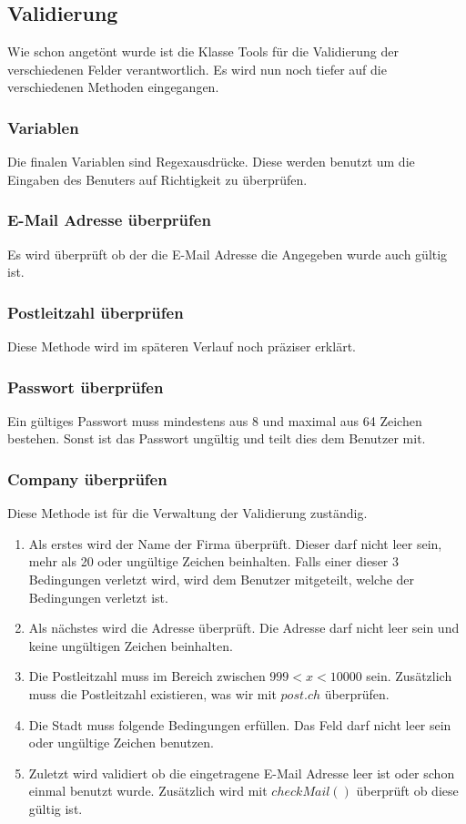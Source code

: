 \documentclass[10pt]{article}
\begin{document}
\subsection{Validierung}
Wie schon angetönt wurde ist die Klasse Tools für die Validierung der verschiedenen Felder verantwortlich. Es wird nun noch tiefer auf die verschiedenen Methoden eingegangen.
\subsubsection{Variablen}
Die finalen Variablen sind Regexausdrücke. Diese werden benutzt um die Eingaben des Benuters auf Richtigkeit zu überprüfen.

\subsubsection{E-Mail Adresse überprüfen}
Es wird überprüft ob der die E-Mail Adresse die Angegeben wurde auch gültig ist.

\subsubsection{Postleitzahl überprüfen}
Diese Methode wird im späteren Verlauf noch präziser erklärt.
\subsubsection{Passwort überprüfen}
Ein gültiges Passwort muss mindestens aus 8 und maximal aus 64 Zeichen bestehen. Sonst ist das Passwort ungültig und teilt dies dem Benutzer mit.

\subsubsection{Company überprüfen}
Diese Methode ist für die Verwaltung der Validierung zuständig. \begin{enumerate}
 \item Als erstes wird der Name der Firma überprüft. Dieser darf nicht leer sein, mehr als 20 oder ungültige Zeichen beinhalten. Falls einer dieser 3 Bedingungen verletzt wird, wird dem Benutzer mitgeteilt, welche der Bedingungen verletzt ist.
 \item Als nächstes wird die Adresse überprüft. Die Adresse darf nicht leer sein und keine ungültigen Zeichen beinhalten.
 \item Die Postleitzahl muss im Bereich zwischen $999 < x < 10000$ sein. Zusätzlich muss die Postleitzahl existieren, was wir mit $post.ch$ überprüfen.
 \item Die Stadt muss folgende Bedingungen erfüllen. Das Feld darf nicht leer sein oder ungültige Zeichen benutzen.
 \item Zuletzt wird validiert ob die eingetragene E-Mail Adresse leer ist oder schon einmal benutzt wurde. Zusätzlich wird mit $checkMail()$ überprüft ob diese gültig ist.
\end{enumerate}

\end{document}
